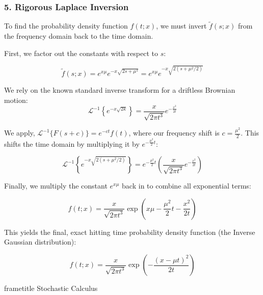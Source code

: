 \documentclass{beamer}
\begin{document}
\begin{frame}
\frametitle{5. Rigorous Laplace Inversion}
To find the probability density function $f(t; x)$, we must invert $\tilde{f}(s; x)$ from the frequency domain back to the time domain.

First, we factor out the constants with respect to $s$:

\[
\tilde{f}(s;x) = e^{x\mu} e^{-x\sqrt{2s+\mu^2}} = e^{x\mu} e^{-x\sqrt{2(s+\mu^2/2)}}
\]

We rely on the known standard inverse transform for a driftless Brownian motion:
\[
\mathcal{L}^{-1} \left\{ e^{-x\sqrt{2k}} \right\} = \frac{x}{\sqrt{2\pi t^3}} e^{-\frac{x^2}{2t}}
\]
\end{frame}
\begin{frame}
We apply, $\mathcal{L}^{-1}\{F(s + c)\} = e^{-ct} f(t)$, where our frequency shift is $c = \frac{\mu^2}{2}$. This shifts the time domain by multiplying it by $e^{-\frac{\mu^2}{2}t}$:

\[
\mathcal{L}^{-1} \left\{ e^{-x\sqrt{2(s+\mu^2/2)}} \right\} = e^{-\frac{\mu^2}{2}t} \left( \frac{x}{\sqrt{2\pi t^3}} e^{-\frac{x^2}{2t}} \right)
\]

Finally, we multiply the constant $e^{x\mu}$ back in to combine all exponential terms:

\[
f(t;x) = \frac{x}{\sqrt{2\pi t^3}} \exp \left( x\mu - \frac{\mu^2}{2}t - \frac{x^2}{2t} \right)
\]
\end{frame}
\begin{frame}
This yields the final, exact hitting time probability density function (the Inverse Gaussian distribution):

\[
f(t;x) = \frac{x}{\sqrt{2\pi t^3}} \exp \left( - \frac{(x - \mu t)^2}{2t} \right)
\]
\end{frame}
\begin{frame}
\begin{beamercolorbox}[wd=\paperwidth,sep=0.3cm,center]{frametitle}
Stochastic Calculus
\end{beamercolorbox}
\end{frame}
\end{document}
